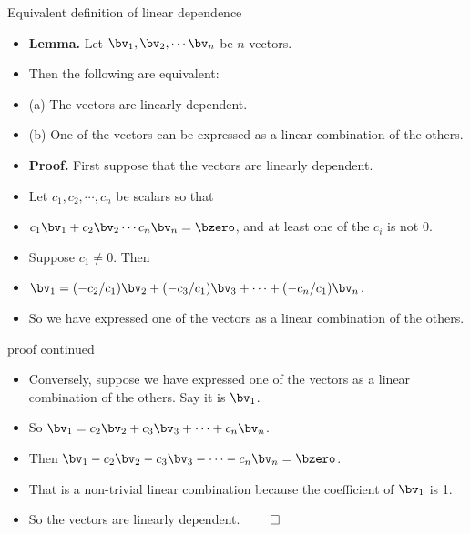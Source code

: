 \documentclass[handout]{beamer}
\begin{document}
\begin{frame}{Equivalent definition of linear dependence}

\begin{itemize}
\item \textbf{Lemma.} Let $\bv_1,\bv_2,\cdots\bv_n$ be $n$ vectors.
\item Then the following are equivalent:
\item (a) The vectors are linearly dependent.
\item (b) One of the vectors can be expressed as a linear combination of the others.
\item \textbf{Proof.} First suppose that the vectors are linearly dependent.
\item Let $c_1,c_2,\cdots,c_n$ be scalars so that
\item $c_1\bv_1+c_2\bv_2\cdots c_n\bv_n = \bzero$, and at least one of the $c_i$ is not 0.
\item Suppose $c_1\not=0$. Then
\item $\bv_1 = (-c_2/c_1)\bv_2 + (-c_3/c_1)\bv_3 + \cdots + (-c_n/c_1)\bv_n$.
\item So we have expressed one of the vectors as a linear combination of the others.
\end{itemize}

\end{frame}


\begin{frame}{proof continued}

\begin{itemize}
\item Conversely, suppose we have expressed one of the vectors as a linear combination
of the others. Say it is $\bv_1$.
\item So $\bv_1 = c_2\bv_2 + c_3\bv_3 + \cdots + c_n \bv_n$.
\item Then $\bv_1 - c_2\bv_2 - c_3\bv_3 - \cdots - c_n\bv_n = \bzero$.
\item That is a non-trivial linear combination because the coefficient of $\bv_1$ is 1.
\item So the vectors are linearly dependent. $\qed$

\end{itemize}

\end{frame}

\end{document}
